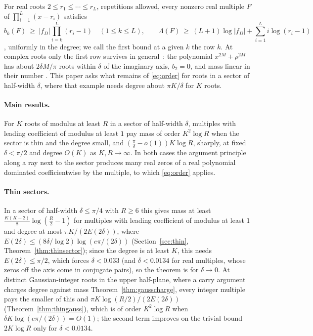 \documentclass[11pt]{article}
\begin{document}
For real roots
$2\le r_1\le\cdots\le r_L$, repetitions allowed, every nonzero real
multiple $F$ of $\prod_{i=1}^L(x-r_i)$ satisfies
\begin{equation}\label{eq:order}
  b_k(F)\ \ge\ |f_D|\prod_{i=k}^L(r_i-1)\quad(1\le k\le L),
  \qquad
  \Lambda(F)\ \ge\ (L+1)\log|f_D|+\sum_{i=1}^Li\log(r_i-1)
\end{equation}
\cite[Theorem~3.2 and Corollary~3.4]{coefficient-mass}, uniformly in
the degree; we call the first bound at a given $k$ the row $k$.  At complex
roots only the first row survives in general~\cite{coefficient-mass-complex}:
the polynomial $x^{2M}+\rho^{2M}$ has about $2\delta M/\pi$ roots within
$\delta$ of the imaginary axis, $b_2=0$, and mass linear in their number
\cite[Proposition~3.2]{coefficient-mass-complex}.
This paper asks what remains of \eqref{eq:order} for roots in a sector
of half-width $\delta$, where that example needs degree about $\pi K/\delta$
for $K$ roots.

\paragraph{Main results.}  For $K$ roots of modulus at least $R$ in a sector
of half-width $\delta$, multiples with leading coefficient of modulus at
least $1$ pay mass of order $K^2\log R$ when the sector is thin and the
degree small, and $(\frac\pi\delta-o(1))K\log R$, sharply, at fixed
$\delta<\pi/2$ and degree $O(K)$ as $K,R\to\infty$.  In both cases the
argument principle along a ray next to the sector produces many real zeros
of a real polynomial dominated coefficientwise by the multiple, to which
\eqref{eq:order} applies.

\paragraph{Thin sectors.}  In a sector of half-width $\delta\le\pi/4$ with
$R\ge6$ this gives mass at least $\frac{K(K-2)}8\log(\frac R2-1)$ for
multiples with leading coefficient of modulus at least $1$ and degree at
most $\pi K/(2E(2\delta))$, where
$E(2\delta)\le(8\delta/\log2)\log(e\pi/(2\delta))$ (Section~\ref{sec:thin},
Theorem~\ref{thm:thinsector}); since the degree is at least $K$, this
needs $E(2\delta)\le\pi/2$, which forces $\delta<0.033$ (and
$\delta<0.0134$ for real multiples, whose zeros off the axis come in
conjugate pairs), so the theorem is for $\delta\to0$.  At distinct
Gaussian-integer roots in the upper half-plane, where a carry argument
charges degree against mass
Theorem~\ref{thm:gausscharge},
every integer multiple pays the smaller of this and
$\pi K\log(R/2)/(2E(2\delta))$ (Theorem~\ref{thm:thingauss}), which is of
order $K^2\log R$ when $\delta K\log(e\pi/(2\delta))=O(1)$; the second
term improves on the trivial bound $2K\log R$ only for
$\delta<0.0134$.
\end{document}
